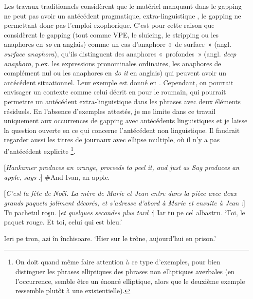 Les travaux traditionnels considèrent que le matériel manquant dans le gapping ne peut pas avoir un antécédent pragmatique, extra-linguistique \citep{HankamerEtAl1976,Chao1988}, le gapping ne permettant donc pas l'emploi exophorique. C’est pour cette raison que \citet{HankamerEtAl1976} considèrent le gapping (tout comme VPE, le sluicing, le stripping ou les anaphores en \textit{so} en anglais) comme un cas d’anaphore «~de surface~» (angl. \textit{surface anaphora}), qu’ils distinguent des anaphores «~profondes~» (angl. \textit{deep anaphora}, p.ex. les expressions pronominales ordinaires, les anaphores de complément nul ou les anaphores en \textit{do it} en anglais) qui peuvent avoir un antécédent situationnel. Leur exemple est donné en . Cependant, on pourrait envisager un contexte comme celui décrit en  pour le roumain, qui pourrait permettre un antécédent extra-linguistique dans les phrases avec deux éléments résiduels. En l’absence d’exemples attestés, je me limite dans ce travail uniquement aux occurrences de gapping avec antécédents linguistiques et je laisse la question ouverte en ce qui concerne l’antécédent non linguistique. Il faudrait regarder aussi les titres de journaux avec ellipse multiple, où il n’y a pas d’antécédent explicite \footnote{
 On doit quand même faire attention à ce type d’exemples, pour bien distinguer les phrases elliptiques des phrases non elliptiques averbales (en l’occurrence,  semble être un énoncé elliptique, alors que le deuxième exemple  ressemble plutôt à une  existentielle).}.

\ea \label{ch2:ex57}
[\textit{Hankamer produces an orange, proceeds to peel it, and just as Sag produces an apple, says :}] \#And Ivan, an apple. \citep{HankamerEtAl1976} 
\z

\ea \label{ch2:ex58}
[\textit{C’est la fête de Noël. La mère de Marie et Jean entre dans la pièce avec deux grands paquets joliment décorés, et s’adresse d’abord à Marie et ensuite à Jean :}] Tu pachetul roşu. [\textit{et quelques secondes plus tard :}] Iar tu pe cel albastru.
\glt ‘Toi, le paquet rouge. Et toi, celui qui est bleu.’     
\z


\ea \label{ch2:ex59}
\ea Ieri pe tron, azi în închisoare. \label{ch2:ex59a}
\glt  ‘Hier sur le trône, aujourd’hui en prison.’   

